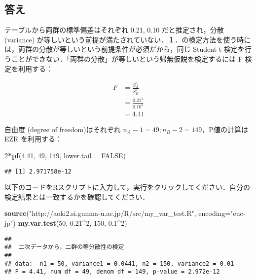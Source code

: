 \documentclass[11pt,]{problemset}
\newenvironment{Shaded}{\begin{snugshade}}{\end{snugshade}}
\newcommand{\DataTypeTok}[1]{\textcolor[rgb]{0.13,0.29,0.53}{#1}}
\newcommand{\DecValTok}[1]{\textcolor[rgb]{0.00,0.00,0.81}{#1}}
\newcommand{\FloatTok}[1]{\textcolor[rgb]{0.00,0.00,0.81}{#1}}
\newcommand{\KeywordTok}[1]{\textcolor[rgb]{0.13,0.29,0.53}{\textbf{#1}}}
\newcommand{\NormalTok}[1]{#1}
\newcommand{\OperatorTok}[1]{\textcolor[rgb]{0.81,0.36,0.00}{\textbf{#1}}}
\newcommand{\OtherTok}[1]{\textcolor[rgb]{0.56,0.35,0.01}{#1}}
\newcommand{\StringTok}[1]{\textcolor[rgb]{0.31,0.60,0.02}{#1}}
\begin{document}
\hypertarget{-1}{%
\subsection{答え}\label{-1}}

テーブルから両群の標準偏差はそれぞれ 0.21, 0.10 だと推定され，分散
(variance)
が等しいという前提が満たされていない．１．の検定方法を使う時には，両群の分散が等しいという前提条件が必須だから，同じ
Student t
検定を行うことができない．「両群の分散」が等しいという帰無仮説を検定するには
F 検定を利用する：

\[
\begin{aligned}
F & = \frac{S^2_A}{S^2_B} \\
  & = \frac{0.21^2}{0.10^2} \\
  & = 4.41
\end{aligned}
\]

自由度 (degree of freedom)はそれぞれ
\(n_A - 1 = 49; n_B -2 = 149\)，P値の計算は EZR を利用する：

\begin{Shaded}
\begin{Highlighting}[]
\DecValTok{2}\OperatorTok{*}\KeywordTok{pf}\NormalTok{(}\FloatTok{4.41}\NormalTok{, }\DecValTok{49}\NormalTok{, }\DecValTok{149}\NormalTok{, }\DataTypeTok{lower.tail =} \OtherTok{FALSE}\NormalTok{)}
\end{Highlighting}
\end{Shaded}

\begin{verbatim}
## [1] 2.971758e-12
\end{verbatim}

\bigskip

以下のコードをRスクリプトに入力して，実行をクリックしてください．自分の検定結果とは一致するかを確認してください．

\begin{Shaded}
\begin{Highlighting}[]
\KeywordTok{source}\NormalTok{(}\StringTok{"http://aoki2.si.gunma-u.ac.jp/R/src/my_var_test.R"}\NormalTok{, }\DataTypeTok{encoding=}\StringTok{"euc-jp"}\NormalTok{)}
\KeywordTok{my.var.test}\NormalTok{(}\DecValTok{50}\NormalTok{, }\FloatTok{0.21}\OperatorTok{^}\DecValTok{2}\NormalTok{, }\DecValTok{150}\NormalTok{, }\FloatTok{0.1}\OperatorTok{^}\DecValTok{2}\NormalTok{)}
\end{Highlighting}
\end{Shaded}

\begin{verbatim}
## 
##  二次データから，二群の等分散性の検定
## 
## data:  n1 = 50, variance1 = 0.0441, n2 = 150, variance2 = 0.01
## F = 4.41, num df = 49, denom df = 149, p-value = 2.972e-12
\end{verbatim}
\end{document}
